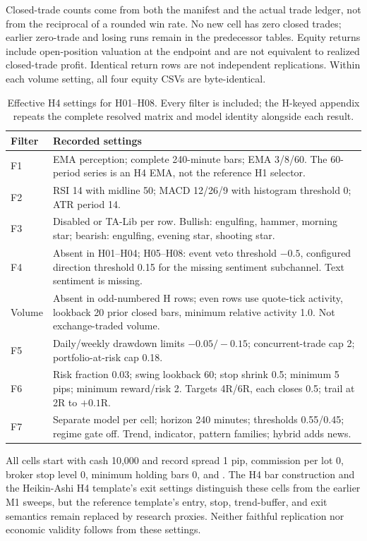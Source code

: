 Closed-trade counts come from both the manifest and the actual trade ledger, not from the reciprocal of a rounded win rate. No new cell has zero closed trades; earlier zero-trade and losing runs remain in the predecessor tables. Equity returns include open-position valuation at the endpoint and are not equivalent to realized closed-trade profit. Identical return rows are not independent replications. Within each volume setting, all four equity CSVs are byte-identical.

\begin{table}[htbp]
\centering
\caption{Effective H4 settings for H01--H08. Every filter is included; the H-keyed appendix repeats the complete resolved matrix and model identity alongside each result.}
\label{tab:h4-parameters}
\small
\begin{tabular}{p{1.2cm}p{12.1cm}}
\toprule
\textbf{Filter} & \textbf{Recorded settings} \\
\midrule
F1 & EMA perception; complete 240-minute bars; EMA 3/8/60. The 60-period series is an H4 EMA, not the reference H1 selector. \\
F2 & RSI 14 with midline 50; MACD 12/26/9 with histogram threshold 0; ATR period 14. \\
F3 & Disabled or TA-Lib per row. Bullish: engulfing, hammer, morning star; bearish: engulfing, evening star, shooting star. \\
F4 & Absent in H01--H04; H05--H08: event veto threshold $-0.5$, configured direction threshold 0.15 for the missing sentiment subchannel. Text sentiment is missing. \\
Volume & Absent in odd-numbered H rows; even rows use quote-tick activity, lookback 20 prior closed bars, minimum relative activity 1.0. Not exchange-traded volume. \\
F5 & Daily/weekly drawdown limits $-0.05/-0.15$; concurrent-trade cap 2; portfolio-at-risk cap 0.18. \\
F6 & Risk fraction 0.03; swing lookback 60; stop shrink 0.5; minimum 5 pips; minimum reward/risk 2. Targets 4R/6R, each closes 0.5; trail at 2R to $+0.1$R. \\
F7 & Separate model per cell; horizon 240 minutes; thresholds 0.55/0.45; regime gate off. Trend, indicator, pattern families; hybrid adds news. \\
\bottomrule
\end{tabular}
\end{table}

All cells start with cash 10,000 and record spread 1 pip, commission per lot 0, broker stop level 0, minimum holding bars 0, and . The H4 bar construction and the Heikin-Ashi H4 template's exit settings distinguish these cells from the earlier M1 sweeps, but the reference template's entry, stop, trend-buffer, and exit semantics remain replaced by research proxies. Neither faithful replication nor economic validity follows from these settings.

